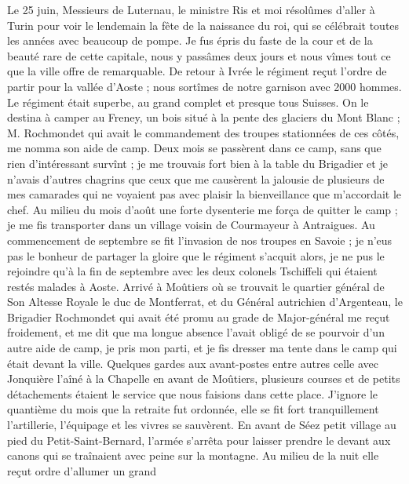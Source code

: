 \documentclass[12pt]{article}
\begin{document}
 Le 25 juin, Messieurs de Luternau, le ministre Ris et
moi résolûmes d’aller à Turin pour voir le lendemain la fête de la naissance du roi, qui se
célébrait toutes les années avec beaucoup de pompe. Je fus épris du faste de la cour et de la beauté
rare de cette capitale, nous y passâmes deux jours et nous vîmes tout ce que la ville offre de
remarquable. De retour à Ivrée le régiment reçut l’ordre de partir pour la vallée d’Aoste ; nous
sortîmes de notre garnison avec 2000 hommes. Le régiment était superbe, au grand complet et presque
tous Suisses. On le destina à camper au Freney, un bois situé à la pente des glaciers du Mont Blanc
; M. Rochmondet qui avait le commandement des troupes stationnées de ces côtés, me nomma son aide de
camp. Deux mois se passèrent dans ce camp, sans que rien d’intéressant survînt ; je me trouvais fort
bien à la table du Brigadier et je n’avais d’autres chagrins que ceux que me causèrent la jalousie
de plusieurs de mes camarades qui ne voyaient pas avec plaisir la bienveillance que m’accordait le
chef. Au milieu du mois d’août une forte dysenterie me força de quitter le camp ; je me fis
transporter dans un village voisin de Courmayeur à Antraigues. Au commencement de septembre se fit
l’invasion de nos troupes en Savoie ; je n’eus pas le bonheur de partager la gloire que le régiment
s’acquit alors, je ne pus le rejoindre qu’à la fin de septembre avec les deux colonels Tschiffeli
qui étaient restés malades à Aoste. Arrivé à Moûtiers où se trouvait le quartier général de Son
Altesse Royale le duc de Montferrat, et du Général autrichien d’Argenteau, le Brigadier Rochmondet
qui avait été promu au grade de Major-général me reçut froidement, et me dit que ma longue absence
l’avait obligé de se pourvoir d’un autre aide de camp, je pris mon parti, et je fis dresser ma tente
dans le camp qui était devant la ville. Quelques gardes aux avant-postes entre autres celle avec
Jonquière l’aîné à la Chapelle en avant de Moûtiers, plusieurs courses et de petits détachements
étaient le service que nous faisions dans cette place. J’ignore le quantième du mois que la retraite
fut ordonnée, elle se fit fort tranquillement l’artillerie, l’équipage et les vivres se sauvèrent.
En avant de Séez petit village au pied du Petit-Saint-Bernard, l’armée s’arrêta pour laisser prendre
le devant aux canons qui se traînaient avec peine sur la montagne. Au milieu de la nuit elle reçut
ordre d’allumer un grand
\end{document}
